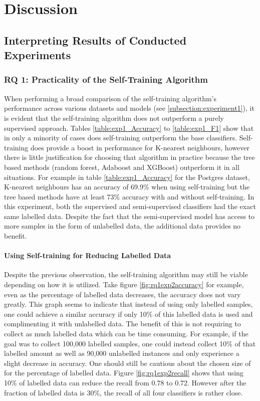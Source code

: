 \documentclass[../main.tex]{subfiles}
\begin{document}
\chapter{Discussion}

\section{Interpreting Results of Conducted Experiments}

\subsection{RQ 1: Practicality of the Self-Training Algorithm}

When performing a broad comparison of the self-training algorithm's performance across various datasets and models (see \ref{subsection:experiment1}), it is evident that the self-training algorithm does not outperform a purely supervised approach. Tables \ref{table:exp1_Accuracy} to \ref{table:exp1_F1} show that in only a minority of cases does self-training outperform the base classifiers. Self-training does provide a boost in performance for K-nearest neighbours, however there is little justification for choosing that algorithm in practice because the tree based methods (random forest, Adaboost and XGBoost) outperform it in all situations. For example in table \ref{table:exp1_Accuracy} for the Postgres dataset, K-nearest neighbours has an accuracy of 69.9\% when using self-training but the tree based methods have at least 73\% accuracy with and without self-training. In this experiment, both the supervised and semi-supervised classifiers had the exact same labelled data. Despite the fact that the semi-supervised model has access to more samples in the form of unlabelled data, the additional data provides no benefit.

\subsubsection{Using Self-training for Reducing Labelled Data}

Despite the previous observation, the self-training algorithm may still be viable depending on how it is utilized. Take figure \ref{fig:rq1exp2accuracy} for example, even as the percentage of labelled data decreases, the accuracy does not vary greatly. This graph seems to indicate that instead of using only labelled samples, one could achieve a similar accuracy if only 10\% of this labelled data is used and complimenting it with unlabelled data. The benefit of this is not requiring to collect as much labelled data which can be time consuming. For example, if the goal was to collect 100,000 labelled samples, one could instead collect 10\% of that labelled amount as well as 90,000 unlabelled instances and only experience a slight decrease in accuracy. One should still be cautious about the chosen size of for the percentage of labelled data. Figure \ref{fig:rq1exp2recall} shows that using 10\% of labelled data can reduce the recall from 0.78 to 0.72. However after the fraction of labelled data is 30\%, the recall of all four classifiers is rather close.
\end{document}
